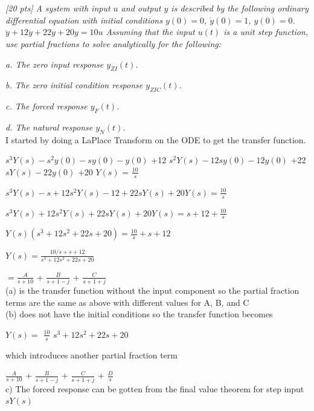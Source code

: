 \documentclass{article}
\begin{document}
\section{}

\textit{[20 pts] A system with input $u$ and output $y$ is described by the following ordinary differential equation with initial conditions $y(0) = 0$, $\dot{y}(0) = 1$, $y(0) = 0$. $\ddot{y} + 12\ddot{y} + 22\dot{y} + 20y = 10u$ Assuming that the input $u(t)$ is a unit step function, use partial fractions to solve analytically for the following:}

\textit{a. The zero input response $y_{ZI}(t)$.}

\textit{b. The zero initial condition response $y_{ZIC}(t)$.}

\textit{c. The forced response $y_F(t)$.} 

\textit{d. The natural response $y_N(t)$.} \\

I started by doing a LaPlace Transform on the ODE to get the transfer function.

$s^3Y(s)-s^2y(0)-sy(0)-y(0)$  
+12 $s^2Y(s)-12sy(0)-12y(0)$  
+22 $sY(s)-22y(0)$ +20 $Y(s)$ = $\frac{10}{s}$  

$s^3Y(s)-s+12s^2Y(s)-12+22sY(s)+20Y(s)=\frac{10}{s}$  

$s^3Y(s)+12s^2Y(s)+22sY(s)+20Y(s)=s+12+\frac{10}{s}$  

$Y(s)(s^3+12s^2+22s+20)=\frac{10}{s}+s+12$  

$Y(s)=\frac{10/s+s+12}{s^3+12s^2+22s+20}$

$=\frac{A}{s+10}$ + $\frac{B}{s+1-j}$ + $\frac{C}{s+1+j}$  \\

(a) is the transfer function without the input component so the partial fraction terms are the same as above with different values for A, B, and C \\

(b) does not have the initial conditions so the transfer function becomes  

$Y(s)=$ $\frac{10}{s}$  
$s^3+12s^2+22s+20$  

which introduces another partial fraction term  

$\frac{A}{s+10}$ + $\frac{B}{s+1-j}$ + $\frac{C}{s+1+j}$ + $\frac{D}{s}$  \\

c) The forced response can be gotten from the final value theorem for step input $sY(s)$  
\end{document}
